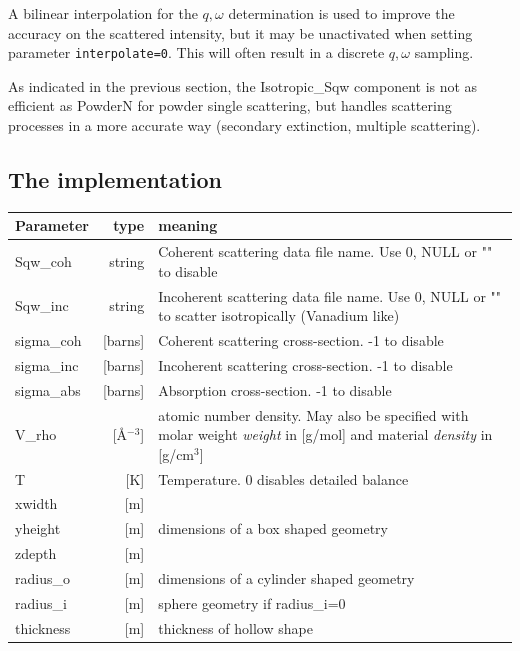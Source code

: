 A bilinear interpolation for the $q,\omega$ determination is used to improve the accuracy on the scattered intensity, but it may be unactivated when setting parameter \verb+interpolate=0+. This will often result in a discrete $q,\omega$ sampling.

As indicated in the previous section, the Isotropic\_Sqw component is not as efficient as PowderN for powder single scattering, but handles scattering processes in a more accurate way (secondary extinction, multiple scattering).

\subsection{The implementation}

\begin{table}
  \begin{center}
  {\let\my=\\
    \begin{tabular}{|lr|p{}|}
    \hline
Parameter & type & meaning \\
    \hline
Sqw\_coh   & string              & Coherent scattering data file name. Use 0, NULL or "" to disable  \\
Sqw\_inc   & string              & Incoherent scattering data file name. Use 0, NULL or "" to scatter isotropically (Vanadium like)  \\
sigma\_coh & [barns]      & Coherent scattering cross-section. -1 to disable \\
sigma\_inc & [barns]      & Incoherent scattering cross-section. -1 to disable \\
sigma\_abs & [barns]      & Absorption cross-section. -1 to disable  \\
V\_rho     & [\AA$^{-3}$] & atomic number density. May also be specified with molar weight \emph{weight} in [g/mol] and material \emph{density} in [g/cm$^3$] \\
T          & [K]          & Temperature. 0 disables detailed balance \\
    \hline
xwidth   & [m] & \\
yheight  & [m] & dimensions of a box shaped geometry \\
zdepth   & [m] & \\
radius\_o & [m] & dimensions of a cylinder shaped geometry  \\
radius\_i & [m] & sphere geometry if radius\_i=0  \\
thickness& [m] & thickness of hollow shape  \\

\end{tabular}}
\end{center}
\end{table}
